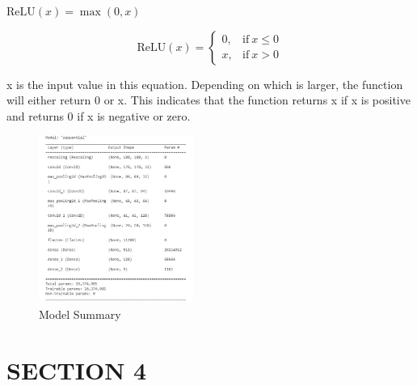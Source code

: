 \documentclass[twocolumn]{article}
\begin{document}
\( \text{ReLU}(x) = \max(0, x) \)

\[
\text{ReLU}(x) = 
\begin{cases}
0, & \text{if}\ x \leq 0 \\
x, & \text{if}\ x > 0
\end{cases}
\]


x is the input value in this equation. Depending on which is larger, the function will either return 0 or x. This indicates that the function returns x if x is positive and returns 0 if x is negative or zero.


\begin{figure}[H]
  \centering
  \includegraphics[width=0.45\textwidth]{modelsequence.jpg}
  \caption{Model Summary}
  \label{fig:image}
\end{figure}
\raggedbottom

\section{SECTION 4}
\end{document}

